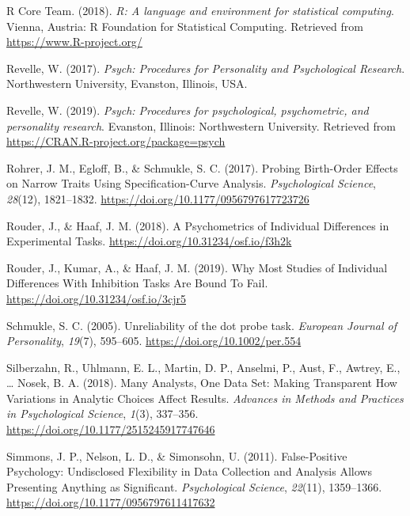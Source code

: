 \documentclass[english,man,floatsintext]{apa6}
\begin{document}
\leavevmode\hypertarget{ref-R-base}{}%
R Core Team. (2018). \emph{R: A language and environment for statistical computing}. Vienna, Austria: R Foundation for Statistical Computing. Retrieved from \url{https://www.R-project.org/}

\leavevmode\hypertarget{ref-revelle_psych:_2017-1}{}%
Revelle, W. (2017). \emph{Psych: Procedures for Personality and Psychological Research}. Northwestern University, Evanston, Illinois, USA.

\leavevmode\hypertarget{ref-R-psych}{}%
Revelle, W. (2019). \emph{Psych: Procedures for psychological, psychometric, and personality research}. Evanston, Illinois: Northwestern University. Retrieved from \url{https://CRAN.R-project.org/package=psych}

\leavevmode\hypertarget{ref-rohrer_probing_2017}{}%
Rohrer, J. M., Egloff, B., \& Schmukle, S. C. (2017). Probing Birth-Order Effects on Narrow Traits Using Specification-Curve Analysis. \emph{Psychological Science}, \emph{28}(12), 1821--1832. \url{https://doi.org/10.1177/0956797617723726}

\leavevmode\hypertarget{ref-rouder_psychometrics_2018}{}%
Rouder, J., \& Haaf, J. M. (2018). A Psychometrics of Individual Differences in Experimental Tasks. \url{https://doi.org/10.31234/osf.io/f3h2k}

\leavevmode\hypertarget{ref-rouder_why_2019}{}%
Rouder, J., Kumar, A., \& Haaf, J. M. (2019). Why Most Studies of Individual Differences With Inhibition Tasks Are Bound To Fail. \url{https://doi.org/10.31234/osf.io/3cjr5}

\leavevmode\hypertarget{ref-schmukle_unreliability_2005}{}%
Schmukle, S. C. (2005). Unreliability of the dot probe task. \emph{European Journal of Personality}, \emph{19}(7), 595--605. \url{https://doi.org/10.1002/per.554}

\leavevmode\hypertarget{ref-silberzahn_many_2018}{}%
Silberzahn, R., Uhlmann, E. L., Martin, D. P., Anselmi, P., Aust, F., Awtrey, E., \ldots{} Nosek, B. A. (2018). Many Analysts, One Data Set: Making Transparent How Variations in Analytic Choices Affect Results. \emph{Advances in Methods and Practices in Psychological Science}, \emph{1}(3), 337--356. \url{https://doi.org/10.1177/2515245917747646}

\leavevmode\hypertarget{ref-simmons_false-positive_2011}{}%
Simmons, J. P., Nelson, L. D., \& Simonsohn, U. (2011). False-Positive Psychology: Undisclosed Flexibility in Data Collection and Analysis Allows Presenting Anything as Significant. \emph{Psychological Science}, \emph{22}(11), 1359--1366. \url{https://doi.org/10.1177/0956797611417632}
\end{document}
